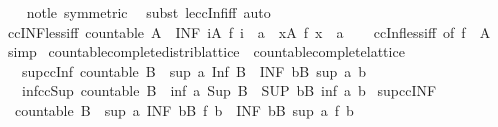 \begin{isabellebody}
%
\isadelimproof
\ \ %
\endisadelimproof
%
\isatagproof
{}\isamarkupfalse%
\ not{\isacharunderscore}le\ {\isacharbrackleft}symmetric{\isacharbrackright}\ \isamarkupfalse%
\ {\isacharparenleft}subst\ le{\isacharunderscore}ccInf{\isacharunderscore}iff{\isacharparenright}\ auto%
\endisatagproof
{\isafoldproof}%
%
\isadelimproof
\isanewline
%
\endisadelimproof
\isanewline
{}\isamarkupfalse%
\ ccINF{\isacharunderscore}less{\isacharunderscore}iff{\isacharcolon}\ {\isachardoublequoteopen}countable\ A\ {\isasymLongrightarrow}\ {\isacharparenleft}INF\ i{\isasymin}A{\isachardot}\ f\ i{\isacharparenright}\ {\isacharless}\ a\ {\isasymlongleftrightarrow}\ {\isacharparenleft}{\isasymexists}x{\isasymin}A{\isachardot}\ f\ x\ {\isacharless}\ a{\isacharparenright}{\isachardoublequoteclose}\isanewline
%
\isadelimproof
\ \ %
\endisadelimproof
%
\isatagproof
{}\isamarkupfalse%
\ ccInf{\isacharunderscore}less{\isacharunderscore}iff\ {\isacharbrackleft}of\ {\isachardoublequoteopen}f\ {\isacharbackquote}\ A{\isachardoublequoteclose}{\isacharbrackright}\ \isamarkupfalse%
\ simp%
\endisatagproof
{\isafoldproof}%
%
\isadelimproof
\isanewline
%
\endisadelimproof
\isanewline
{}\isamarkupfalse%
\isanewline
\isanewline
{}\isamarkupfalse%
\ countable{\isacharunderscore}complete{\isacharunderscore}distrib{\isacharunderscore}lattice\ {\isacharequal}\ countable{\isacharunderscore}complete{\isacharunderscore}lattice\ {\isacharplus}\isanewline
\ \ \ sup{\isacharunderscore}ccInf{\isacharcolon}\ {\isachardoublequoteopen}countable\ B\ {\isasymLongrightarrow}\ sup\ a\ {\isacharparenleft}Inf\ B{\isacharparenright}\ {\isacharequal}\ {\isacharparenleft}INF\ b{\isasymin}B{\isachardot}\ sup\ a\ b{\isacharparenright}{\isachardoublequoteclose}\isanewline
\ \ \ inf{\isacharunderscore}ccSup{\isacharcolon}\ {\isachardoublequoteopen}countable\ B\ {\isasymLongrightarrow}\ inf\ a\ {\isacharparenleft}Sup\ B{\isacharparenright}\ {\isacharequal}\ {\isacharparenleft}SUP\ b{\isasymin}B{\isachardot}\ inf\ a\ b{\isacharparenright}{\isachardoublequoteclose}\isanewline
{}\isanewline
\isanewline
{}\isamarkupfalse%
\ sup{\isacharunderscore}ccINF{\isacharcolon}\isanewline
\ \ {\isachardoublequoteopen}countable\ B\ {\isasymLongrightarrow}\ sup\ a\ {\isacharparenleft}INF\ b{\isasymin}B{\isachardot}\ f\ b{\isacharparenright}\ {\isacharequal}\ {\isacharparenleft}INF\ b{\isasymin}B{\isachardot}\ sup\ a\ {\isacharparenleft}f\ b{\isacharparenright}{\isacharparenright}{\isachardoublequoteclose}\isanewline

\end{isabellebody}
